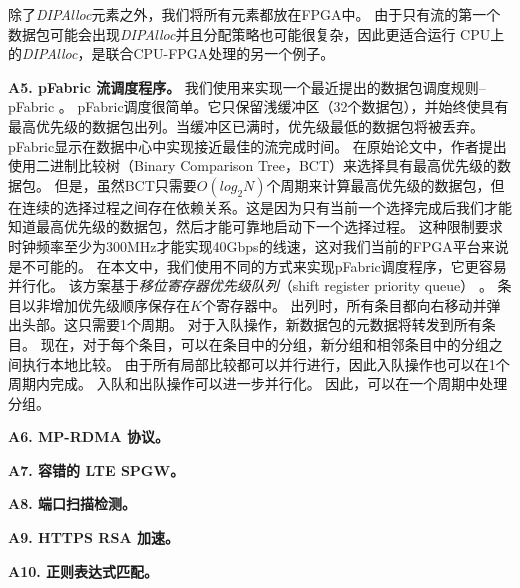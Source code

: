 除了\textit {DIPAlloc}元素之外，我们将所有元素都放在FPGA中。
由于只有流的第一个数据包可能会出现\textit {DIPAlloc}并且分配策略也可能很复杂，因此更适合运行
CPU上的\textit {DIPAlloc}，是联合CPU-FPGA处理的另一个例子。

%



\textbf {A5. pFabric 流调度程序。}
我们使用\name 来实现一个最近提出的数据包调度规则--pFabric \cite {pfabric}。
pFabric调度很简单。它只保留浅缓冲区（32个数据包），并始终使具有最高优先级的数据包出列。当缓冲区已满时，优先级最低的数据包将被丢弃。
pFabric显示在数据中心中实现接近最佳的流完成时间。
在原始论文中，作者提出使用二进制比较树（Binary Comparison Tree，BCT）来选择具有最高优先级的数据包。
但是，虽然BCT只需要$O(log_2 N)$个周期来计算最高优先级的数据包，但在连续的选择过程之间存在依赖关系。这是因为只有当前一个选择完成后我们才能知道最高优先级的数据包，然后才能可靠地启动下一个选择过程。
这种限制要求时钟频率至少为300MHz才能实现40Gbps的线速，这对我们当前的FPGA平台来说是不可能的。
在本文中，我们使用不同的方式来实现pFabric调度程序，它更容易并行化。
该方案基于\textit{移位寄存器优先级队列}（shift register priority queue） \cite {moon2000scalable}。
条目以非增加优先级顺序保存在$K$个寄存器中。
出列时，所有条目都向右移动并弹出头部。这只需要1个周期。
对于入队操作，新数据包的元数据将转发到所有条目。
现在，对于每个条目，可以在条目中的分组，新分组和相邻条目中的分组之间执行本地比较。
由于所有局部比较都可以并行进行，因此入队操作也可以在1个周期内完成。
入队和出队操作可以进一步并行化。
因此，可以在一个周期中处理分组。

\textbf{A6. MP-RDMA 协议。}

\textbf{A7. 容错的 LTE SPGW。}

\textbf{A8. 端口扫描检测。}

\textbf{A9. HTTPS RSA 加速。}

\textbf{A10. 正则表达式匹配。}

